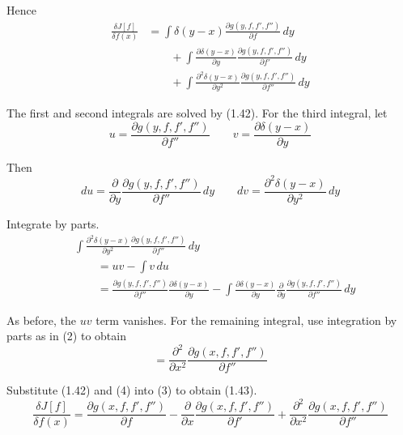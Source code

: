 \documentclass[12pt]{article}
\begin{document}
Hence
\begin{equation*}
\begin{aligned}
\frac{\delta J[f]}{\delta f(x)}
&=\int\delta(y-x)\frac{\partial g(y,f,f',f'')}{\partial f}\,dy
\\
&\qquad{}+\int\frac{\partial\delta(y-x)}{\partial y}\frac{\partial g(y,f,f',f'')}{\partial f'}\,dy
\\
&\qquad{}+\int\frac{\partial^2\delta(y-x)}{\partial y^2}\frac{\partial g(y,f,f',f'')}{\partial f''}\,dy
\end{aligned}
\tag{3}
\end{equation*}

The first and second integrals are solved by (1.42).
For the third integral, let
\begin{equation*}
u=\frac{\partial g(y,f,f',f'')}{\partial f''}
\qquad
v=\frac{\partial\delta(y-x)}{\partial y}
\end{equation*}

Then
\begin{equation*}
du=\frac{\partial}{\partial y}\frac{\partial g(y,f,f',f'')}{\partial f''}\,dy
\qquad
dv=\frac{\partial^2\delta(y-x)}{\partial y^2}\,dy
\end{equation*}

Integrate by parts.
\begin{align*}
&\int\frac{\partial^2\delta(y-x)}{\partial y^2}\frac{\partial g(y,f,f',f'')}{\partial f''}\,dy
\\
&\qquad{}=uv-\int v\,du
\\
&\qquad{}=\frac{\partial g(y,f,f',f'')}{\partial f''}\frac{\partial\delta(y-x)}{\partial y}
-\int\frac{\partial\delta(y-x)}{\partial y}
\frac{\partial}{\partial y}\frac{\partial g(y,f,f',f'')}{\partial f''}\,dy
\end{align*}

As before, the $uv$ term vanishes.
For the remaining integral, use integration by parts as in (2) to obtain
\begin{equation*}
{}=\frac{\partial^2}{\partial x^2}\frac{\partial g(x,f,f',f'')}{\partial f''}
\tag{4}
\end{equation*}

Substitute (1.42) and (4) into (3) to obtain (1.43).
\begin{equation*}
\frac{\delta J[f]}{\delta f(x)}
=\frac{\partial g(x,f,f',f'')}{\partial f}
-\frac{\partial}{\partial x}\frac{\partial g(x,f,f',f'')}{\partial f'}
+\frac{\partial^2}{\partial x^2}\frac{\partial g(x,f,f',f'')}{\partial f''}
\end{equation*}
\end{document}
